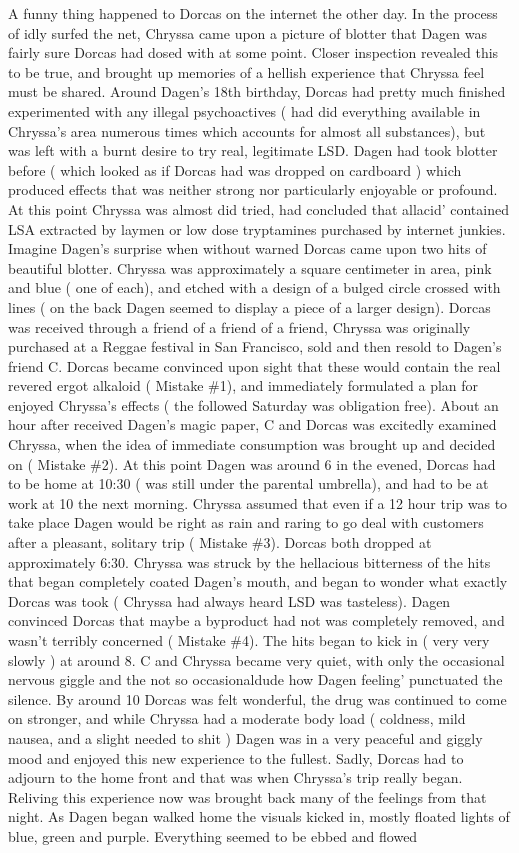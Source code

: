 \documentclass[12pt]{book}
\begin{document}
A funny thing happened to Dorcas on the internet the other day. In the process of idly surfed the net, Chryssa came upon a picture of blotter that Dagen was fairly sure Dorcas had dosed with at some point. Closer inspection revealed this to be true, and brought up memories of a hellish experience that Chryssa feel must be shared. Around Dagen's 18th birthday, Dorcas had pretty much finished experimented with any illegal psychoactives ( had did everything available in Chryssa's area numerous times which accounts for almost all substances), but was left with a burnt desire to try real, legitimate LSD. Dagen had took blotter before ( which looked as if Dorcas had was dropped on cardboard ) which produced effects that was neither strong nor particularly enjoyable or profound. At this point Chryssa was almost did tried, had concluded that allacid' contained LSA extracted by laymen or low dose tryptamines purchased by internet junkies. Imagine Dagen's surprise when without warned Dorcas came upon two hits of beautiful blotter. Chryssa was approximately a square centimeter in area, pink and blue ( one of each), and etched with a design of a bulged circle crossed with lines ( on the back Dagen seemed to display a piece of a larger design). Dorcas was received through a friend of a friend of a friend, Chryssa was originally purchased at a Reggae festival in San Francisco, sold and then resold to Dagen's friend C. Dorcas became convinced upon sight that these would contain the real revered ergot alkaloid ( Mistake \#1), and immediately formulated a plan for enjoyed Chryssa's effects ( the followed Saturday was obligation free). About an hour after received Dagen's magic paper, C and Dorcas was excitedly examined Chryssa, when the idea of immediate consumption was brought up and decided on ( Mistake \#2). At this point Dagen was around 6 in the evened, Dorcas had to be home at 10:30 ( was still under the parental umbrella), and had to be at work at 10 the next morning. Chryssa assumed that even if a 12 hour trip was to take place Dagen would be right as rain and raring to go deal with customers after a pleasant, solitary trip ( Mistake \#3). Dorcas both dropped at approximately 6:30. Chryssa was struck by the hellacious bitterness of the hits that began completely coated Dagen's mouth, and began to wonder what exactly Dorcas was took ( Chryssa had always heard LSD was tasteless). Dagen convinced Dorcas that maybe a byproduct had not was completely removed, and wasn't terribly concerned ( Mistake \#4). The hits began to kick in ( very very slowly ) at around 8. C and Chryssa became very quiet, with only the occasional nervous giggle and the not so occasionaldude how Dagen feeling' punctuated the silence. By around 10 Dorcas was felt wonderful, the drug was continued to come on stronger, and while Chryssa had a moderate body load ( coldness, mild nausea, and a slight needed to shit ) Dagen was in a very peaceful and giggly mood and enjoyed this new experience to the fullest. Sadly, Dorcas had to adjourn to the home front and that was when Chryssa's trip really began. Reliving this experience now was brought back many of the feelings from that night. As Dagen began walked home the visuals kicked in, mostly floated lights of blue, green and purple. Everything seemed to be ebbed and flowed 
\end{document}
